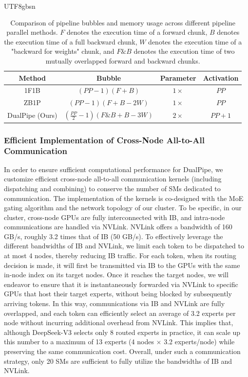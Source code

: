 \documentclass[11pt, a4paper, logo, copyright, nonumbering]{deepseek}
\newcommand{\dsviii}{DeepSeek-V3}
\begin{document}
\begin{CJK*}{UTF8}{gbsn}
\begin{table}[t]
    \centering
    \setlength{\tabcolsep}{15pt}
    \begin{tabular}{c c c c}
        \toprule
        \textbf{Method} & \textbf{Bubble} & \textbf{Parameter} & \textbf{Activation} \\
        \midrule
        1F1B     & $(PP - 1)(F + B)$       & $1\times$ & $PP$ \\
        ZB1P     & $(PP - 1)(F + B - 2W)$   & $1\times$ & $PP$ \\
        DualPipe (Ours) & $(\frac{PP}{2} - 1)(F\&B + B - 3W)$ & $2\times$ & $PP + 1$ \\
        \bottomrule
    \end{tabular}
    \caption{
        Comparison of pipeline bubbles and memory usage across different pipeline parallel methods. $F$ denotes the execution time of a forward chunk, $B$ denotes the execution time of a full backward chunk, $W$ denotes the execution time of a "backward for weights" chunk, and $F\&B$ denotes the execution time of two mutually overlapped forward and backward chunks.
    }
    \label{tab:dualpipe-bubble}
\end{table}

\subsubsection{Efficient Implementation of Cross-Node All-to-All Communication}

In order to ensure sufficient computational performance for DualPipe, we customize efficient cross-node all-to-all communication kernels (including dispatching and combining) to conserve the number of SMs dedicated to communication.
The implementation of the kernels is co-designed with the MoE gating algorithm and the network topology of our cluster.
To be specific, in our cluster, cross-node GPUs are fully interconnected with IB, and intra-node communications are handled via NVLink.
NVLink offers a bandwidth of 160 GB/s, roughly 3.2 times that of IB (50 GB/s). 
To effectively leverage the different bandwidths of IB and NVLink, we limit each token to be dispatched to at most 4 nodes, thereby reducing IB traffic.
For each token, when its routing decision is made, it will first be transmitted via IB to the GPUs with the same in-node index on its target nodes. 
Once it reaches the target nodes, we will endeavor to ensure that it is instantaneously forwarded via NVLink to specific GPUs that host their target experts, without being blocked by subsequently arriving tokens.
In this way, communications via IB and NVLink are fully overlapped, and each token can efficiently select an average of 3.2 experts per node without incurring additional overhead from NVLink.
This implies that, although \dsviii{} selects only 8 routed experts in practice, it can scale up this number to a maximum of 13 experts (4 nodes $\times$ 3.2 experts/node) while preserving the same communication cost.
Overall, under such a communication strategy, only 20 SMs are sufficient to fully utilize the bandwidths of IB and NVLink.


\end{CJK*}
\end{document}

